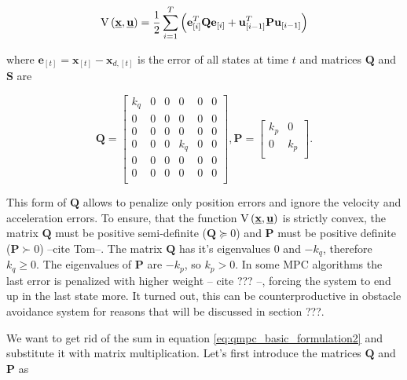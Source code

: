 \documentclass{article}
\newcommand{\uvec}{\textbf{\underline{u}}}
\begin{document}
\begin{equation}
\label{eq:qmpc_sum}
\mathrm{V}\left(\textbf{\underline{x}}, \uvec\right) = \frac{1}{2}\sum_{i=1}^{T}\left(\textbf{e}^T_{[i]}\textbf{Q}\textbf{e}_{[i]} + \textbf{u}^T_{[i-1]}\textbf{P}\textbf{u}_{[i-1]}\right)
\end{equation}

where $\textbf{e}_{[t]} = \textbf{x}_{[t]} - \textbf{x}_{d,[t]}$ is the error of all states at time $t$  and matrices $\textbf{Q}$ and $\textbf{S}$ are

\begin{equation}
\label{eq:qmpc_weighting_matrices_simple}
\textbf{Q} = \begin{bmatrix}
k_q & 0 & 0 & 0 & 0 & 0 \\
0 & 0 & 0 & 0 & 0 & 0 \\
0 & 0 & 0 & 0 & 0 & 0 \\
0 & 0 & 0 & k_q & 0 & 0 \\
0 & 0 & 0 & 0 & 0 & 0 \\
0 & 0 & 0 & 0 & 0 & 0 \\
\end{bmatrix}, 
\textbf{P} = \begin{bmatrix}
k_p & 0\\
0 & k_p\\
\end{bmatrix}.
\end{equation}

This form of $\textbf{Q}$ allows to penalize only position errors and ignore the velocity and acceleration errors. To ensure, that the function $\mathrm{V}\left(\textbf{\underline{x}}, \uvec\right)$ is strictly convex, the matrix $\textbf{Q}$ must be positive semi-definite ($\textbf{Q} \succeq 0$) and $\textbf{P}$ must be positive definite ($\textbf{P} \succ 0$) --cite Tom--. The matrix $\textbf{Q}$ has it's eigenvalues $0$ and $-k_q$, therefore $k_q \geq 0$. The eigenvalues of $\textbf{P}$ are $-k_p$, so $k_p > 0$. In some MPC algorithms the last error is penalized with higher weight -- cite ??? --, forcing the system to end up in the last state more. It turned out, this can be counterproductive in obstacle avoidance system for reasons that will be discussed in section ???.

We want to get rid of the sum in equation \ref{eq:qmpc_basic_formulation2} and substitute it with matrix multiplication. Let's first introduce the matrices $\textbf{\^Q}$ and $\textbf{\^P}$ as 
\end{document}
